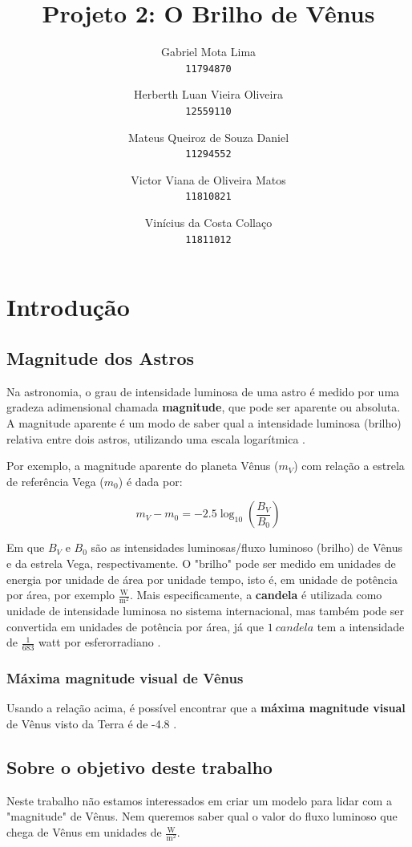 \documentclass[a4paper, 12pt]{article}
\title{Projeto 2: O Brilho de Vênus}
\author{
  Gabriel Mota Lima\\
  \texttt{11794870}
  \and
  Herberth Luan Vieira Oliveira\\
  \texttt{12559110}
  \and
  Mateus Queiroz de Souza Daniel\\
  \texttt{11294552}
  \and
  Victor Viana de Oliveira Matos\\
  \texttt{11810821}
  \and
  Vinícius da Costa Collaço\\
  \texttt{11811012}
}
\begin{document}
\maketitle

\section{Introdução}

\subsection{Magnitude dos Astros}
Na astronomia, o grau de intensidade luminosa de uma astro é medido por uma gradeza adimensional chamada \textbf{magnitude}, que pode ser aparente ou absoluta. A magnitude aparente é um modo de saber qual a intensidade luminosa (brilho) relativa entre dois astros, utilizando uma escala logarítmica \citep{livro_fundamentals_of_astronomy}.

Por exemplo, a magnitude aparente do planeta Vênus ($m_V$) com relação a estrela de referência Vega ($m_0$) é dada por:

$$
    m_V-m_0=-2.5\log _{10}\left(\frac{B_V}{B_0}\right)
$$

Em que $B_V$ e $B_0$ são as intensidades luminosas/fluxo luminoso (brilho) de Vênus e da estrela Vega, respectivamente. O "brilho" pode ser medido em unidades de energia por unidade de área por unidade tempo, isto é, em unidade de potência por área, por exemplo $\mathrm{\frac{W}{m^2}}$. Mais especificamente, a \textbf{candela} é utilizada como unidade de intensidade luminosa no sistema internacional, mas também pode ser convertida em unidades de potência por área, já que $1\ candela$ tem a intensidade de $\frac{1}{683}$ watt por esferorradiano \citep{wikipedia_candela}. 

\subsubsection{Máxima magnitude visual de Vênus}

Usando a relação acima, é possível encontrar que a \textbf{máxima magnitude visual} de Vênus visto da Terra é de -4.8 \citep{site_nasa_venus_fact_sheet}.

\subsection{Sobre o objetivo deste trabalho}

Neste trabalho não estamos interessados em criar um modelo para lidar com a "magnitude" de Vênus. Nem queremos saber qual o valor do fluxo luminoso que chega de Vênus em unidades de $\mathrm{\frac{W}{m^2}}$.
\end{document}
